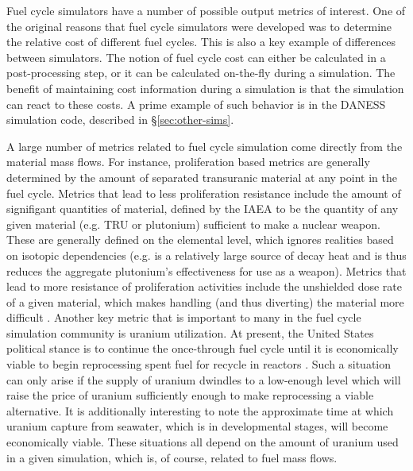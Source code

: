 Fuel cycle simulators have a number of possible output metrics of interest. One
of the original reasons that fuel cycle simulators were developed was to
determine the relative cost of different fuel cycles. This is also a key example
of differences between simulators. The notion of fuel cycle cost can either be
calculated in a post-processing step, or it can be calculated on-the-fly during
a simulation. The benefit of maintaining cost information during a simulation is
that the simulation can react to these costs. A prime example of such behavior
is in the DANESS simulation code, described in \S\ref{sec:other-sims}. 

A large number of metrics related to fuel cycle simulation come directly from
the material mass flows. For instance, proliferation based metrics are generally
determined by the amount of separated transuranic material at any point in the
fuel cycle. Metrics that lead to less proliferation resistance include the
amount of signifigant quantities of material, defined by the IAEA to be the
quantity of any given material (e.g. TRU or plutonium) sufficient to make a
nuclear weapon. These are generally defined on the elemental level, which
ignores realities based on isotopic dependencies (e.g.  is a
relatively large source of decay heat and is thus reduces the aggregate
plutonium's effectiveness for use as a weapon). Metrics that lead to more
resistance of proliferation activities include the unshielded dose rate of a
given material, which makes handling (and thus diverting) the material more
difficult \cite{yacout_vision_2006}. Another key metric that is important to
many in the fuel cycle simulation community is uranium utilization. At present,
the United States political stance is to continue the once-through fuel cycle
until it is economically viable to begin reprocessing spent fuel for recycle in
reactors \cite{hamilton_blue_2012}. Such a situation can only arise if the
supply of uranium dwindles to a low-enough level which will raise the price of
uranium sufficiently enough to make reprocessing a viable alternative. It is
additionally interesting to note the approximate time at which uranium capture
from seawater, which is in developmental stages, will become economically
viable. These situations all depend on the amount of uranium used in a given
simulation, which is, of course, related to fuel mass flows.

